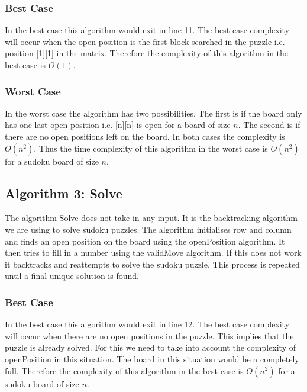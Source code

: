 \documentclass[12pt,a4paper,titlepage]{article}
\begin{document}
\subsubsection{Best Case}

In the best case this algorithm would exit in line 11. The best case complexity will occur when the open position is the first block searched in the puzzle i.e. position [1][1] in the matrix. Therefore the complexity of this algorithm in the best case is $O(1)$.

\subsubsection{Worst Case}

In the worst case the algorithm has two possibilities. The first is if the board only has one last open position i.e. [n][n] is open for a board of size $n$. The second is if there are no open positions left on the board. In both cases the complexity is $O(n^{2})$. Thus the time complexity of this algorithm in the worst case is $O(n^{2})$ for a sudoku board of size $n$.

\newpage
\subsection{Algorithm 3: Solve}

The algorithm Solve does not take in any input. It is the backtracking algorithm we are using to solve sudoku puzzles. The algorithm initialises row and column and finds an open position on the board using the openPosition algorithm. It then tries to fill in a number using the validMove algorithm. If this does not work it backtracks and reattempts to solve the sudoku puzzle. This process is repeated until a final unique solution is found.

\subsubsection{Best Case}

In the best case this algorithm would exit in line 12. The best case complexity will occur when there are no open positions in the puzzle. This implies that the puzzle is already solved. For this we need to take into account the complexity of openPosition in this situation. The board in this situation would be a completely full. Therefore the complexity of this algorithm in the best case is $O(n^{2})$ for a sudoku board of size $n$.
\end{document}
